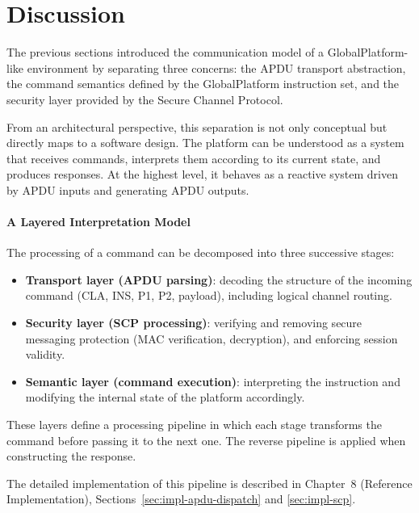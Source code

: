 \section{Discussion}

The previous sections introduced the communication model of a
GlobalPlatform-like environment by separating three concerns: the APDU
transport abstraction, the command semantics defined by the GlobalPlatform
instruction set, and the security layer provided by the Secure Channel
Protocol.

From an architectural perspective, this separation is not only conceptual but
directly maps to a software design. The platform can be understood as a system
that receives commands, interprets them according to its current state, and
produces responses. At the highest level, it behaves as a reactive system
driven by APDU inputs and generating APDU outputs.

\paragraph{A Layered Interpretation Model}

The processing of a command can be decomposed into three successive stages:

\begin{itemize}
\item \textbf{Transport layer (APDU parsing)}: decoding the structure of the
    incoming command (CLA, INS, P1, P2, payload), including logical channel
        routing.

\item \textbf{Security layer (SCP processing)}: verifying and removing secure
    messaging protection (MAC verification, decryption), and enforcing session
        validity.

\item \textbf{Semantic layer (command execution)}: interpreting the instruction
    and modifying the internal state of the platform accordingly.
\end{itemize}

These layers define a processing pipeline in which each stage transforms the
command before passing it to the next one. The reverse pipeline is applied when
constructing the response.

The detailed implementation of this pipeline is described in Chapter~8
(Reference Implementation), Sections~\ref{sec:impl-apdu-dispatch} and
\ref{sec:impl-scp}.

